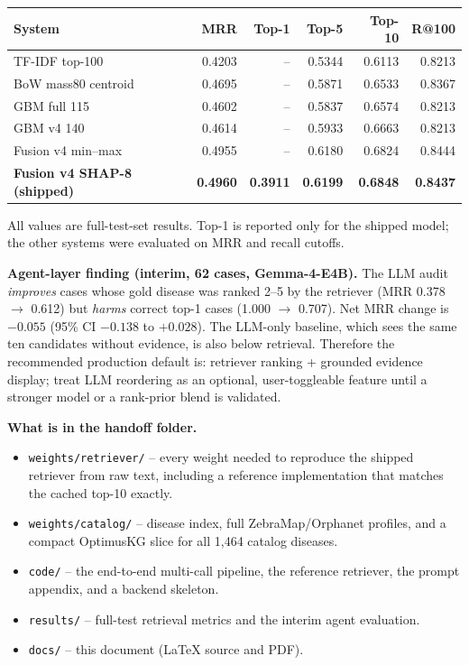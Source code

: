 \documentclass[11pt,a4paper]{article}
\newcommand{\code}[1]{\texttt{\small #1}}
\newcommand{\key}[1]{\textbf{#1}}
\begin{document}
\begin{center}
\begin{tabular}{lrrrrr}
\toprule
System & MRR & Top-1 & Top-5 & Top-10 & R@100\\
\midrule
TF-IDF top-100 & 0.4203 & -- & 0.5344 & 0.6113 & 0.8213\\
BoW mass80 centroid & 0.4695 & -- & 0.5871 & 0.6533 & 0.8367\\
GBM full 115 & 0.4602 & -- & 0.5837 & 0.6574 & 0.8213\\
GBM v4 140 & 0.4614 & -- & 0.5933 & 0.6663 & 0.8213\\
Fusion v4 min--max & 0.4955 & -- & 0.6180 & 0.6824 & 0.8444\\
\textbf{Fusion v4 SHAP-8 (shipped)} & \textbf{0.4960} & \textbf{0.3911} & \textbf{0.6199} & \textbf{0.6848} & \textbf{0.8437}\\
\bottomrule
\end{tabular}
\end{center}
{\footnotesize All values are full-test-set results. Top-1 is reported only for the
shipped model; the other systems were evaluated on MRR and recall cutoffs.}

\key{Agent-layer finding (interim, 62 cases, Gemma-4-E4B).} The LLM audit
\emph{improves} cases whose gold disease was ranked 2--5 by the retriever
(MRR 0.378 $\rightarrow$ 0.612) but \emph{harms} correct top-1 cases
(1.000 $\rightarrow$ 0.707). Net MRR change is $-0.055$ (95\% CI $-0.138$ to $+0.028$).
The LLM-only baseline, which sees the same ten candidates without evidence, is also
below retrieval. Therefore the recommended production default is:
retriever ranking + grounded evidence display; treat LLM reordering as an optional,
user-toggleable feature until a stronger model or a rank-prior blend is validated.

\key{What is in the handoff folder.}
\begin{itemize}[leftmargin=1.4em]
\item \code{weights/retriever/} -- every weight needed to reproduce the shipped
retriever from raw text, including a reference implementation that matches the
cached top-10 exactly.
\item \code{weights/catalog/} -- disease index, full ZebraMap/Orphanet profiles, and
a compact OptimusKG slice for all 1,464 catalog diseases.
\item \code{code/} -- the end-to-end multi-call pipeline, the reference retriever,
the prompt appendix, and a backend skeleton.
\item \code{results/} -- full-test retrieval metrics and the interim agent evaluation.
\item \code{docs/} -- this document (LaTeX source and PDF).
\end{itemize}
\end{document}
